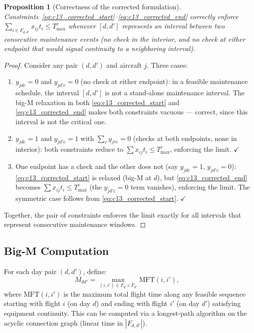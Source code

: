 \documentclass[11pt, a4paper]{article}
\theoremstyle{plain}
\newtheorem{proposition}{Proposition}
\theoremstyle{definition}
\theoremstyle{remark}
\begin{document}
\begin{proposition}[Correctness of the corrected formulation]
Constraints~\eqref{eq:c13_corrected_start}--\eqref{eq:c13_corrected_end}
correctly enforce $\sum_{i \in F_{d,d'}} x_{ij} t_i \leq T^c_{\max}$ whenever
$[d, d']$ represents an interval between two consecutive maintenance events
(no check in the interior, and no check at either endpoint that would signal
continuity to a neighboring interval).
\end{proposition}
\begin{proof}
Consider any pair $(d,d')$ and aircraft $j$. Three cases:
\begin{enumerate}
  \item $y_{jdc}=0$ and $y_{jd'c}=0$ (no check at either endpoint): in a
  feasible maintenance schedule, the interval $[d,d']$ is not a stand-alone
  maintenance interval. The big-M relaxation in both \eqref{eq:c13_corrected_start}
  and \eqref{eq:c13_corrected_end} makes both constraints vacuous — correct,
  since this interval is not the critical one.

  \item $y_{jdc}=1$ and $y_{jd'c}=1$ with $\sum_r y_{jrc}=0$ (checks at both
  endpoints, none in interior): both constraints reduce to
  $\sum x_{ij}t_i \leq T^c_{\max}$, enforcing the limit. $\checkmark$

  \item One endpoint has a check and the other does not (say $y_{jdc}=1$,
  $y_{jd'c}=0$): \eqref{eq:c13_corrected_start} is relaxed (big-M at $d$),
  but \eqref{eq:c13_corrected_end} becomes $\sum x_{ij}t_i \leq T^c_{\max}$
  (the $y_{jd'c}=0$ term vanishes), enforcing the limit.
  The symmetric case follows from \eqref{eq:c13_corrected_start}. $\checkmark$
\end{enumerate}
Together, the pair of constraints enforces the limit exactly for all intervals
that represent consecutive maintenance windows.
\end{proof}

\subsection{Big-M Computation}

For each day pair $(d, d')$, define:
\begin{equation}
  M_{dd'} = \max_{(i,i') \in F_d \times F_{d'}} \text{MFT}(i, i'),
\end{equation}
where $\text{MFT}(i, i')$ is the maximum total flight time along any feasible
sequence starting with flight $i$ (on day $d$) and ending with flight $i'$ (on day $d'$)
satisfying equipment continuity. This can be computed via a longest-path algorithm
on the acyclic connection graph (linear time in $|F_{d,d'}|$).
\end{document}
